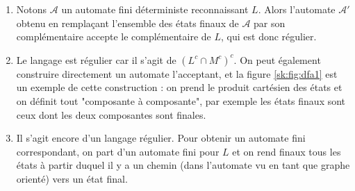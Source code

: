 \begin{sol}
\begin{enumerate}
\item Notons $\mathcal A$ un automate fini déterministe reconnaissant $L$. Alors l'automate $\mathcal A'$ obtenu en remplaçant l'ensemble des états finaux de $\mathcal A$ par son complémentaire accepte le complémentaire de $L$, qui est donc régulier.
\item Le langage est régulier car il s'agit de $(L^c\cap M^c)^c$. On peut également construire directement un automate l'acceptant, et la figure \ref{sk:fig:dfa1} est un exemple de cette construction : on prend le produit cartésien des états et on définit tout "composante à composante", par exemple les états finaux sont ceux dont les deux composantes sont finales.
\item Il s'agit encore d'un langage régulier. Pour obtenir un automate fini correspondant, on part d'un automate fini pour $L$ et on rend finaux tous les états à partir duquel il y a un chemin (dans l'automate vu en tant que graphe orienté) vers un état final.
\end{enumerate}
\end{sol}


